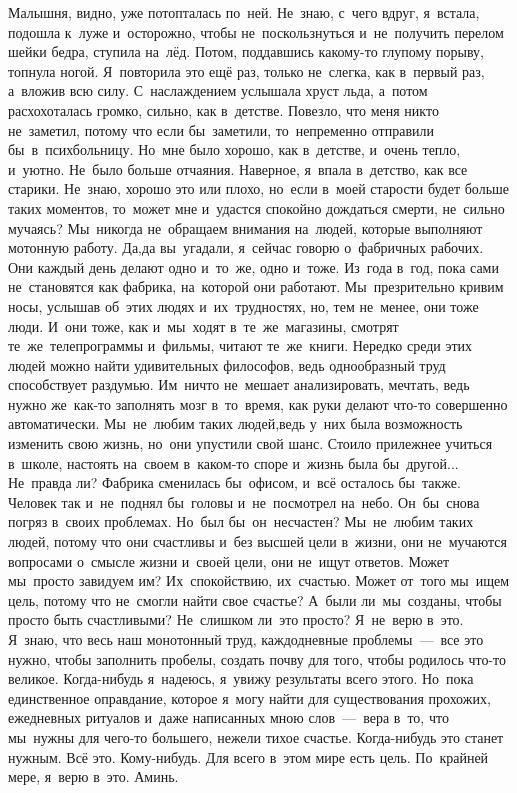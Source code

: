 Малышня, видно, уже потопталась по~ней.
Не~знаю, с~чего вдруг, я~встала, подошла к~луже и~осторожно, чтобы не~поскользнуться и~не~получить перелом шейки бедра, ступила на~лёд.
Потом, поддавшись какому-то глупому порыву, топнула ногой.
Я~повторила это ещё раз, только не~слегка, как в~первый раз, а~вложив всю силу.
С~наслаждением услышала хруст льда, а~потом расхохоталась громко, сильно, как в~детстве.
Повезло, что меня никто не~заметил, потому что если бы~заметили, то~непременно отправили бы~в~психбольницу.
Но~мне было хорошо, как в~детстве, и~очень тепло, и~уютно.
Не~было больше отчаяния.
Наверное, я~впала в~детство, как все старики.
Не~знаю, хорошо это или плохо, но~если в~моей старости будет больше таких моментов, то~может мне и~удастся спокойно дождаться смерти, не~сильно мучаясь?
\clearpage
\chaps{***} 
\lettrine[lines=3, loversize=0.1]{М}{}ы~никогда не~обращаем внимания на~людей, которые выполняют мотонную работу.
Да,да вы~угадали, я~сейчас говорю о~фабричных рабочих.
Они каждый день делают одно и~то~же, одно и~тоже.
Из~года в~год, пока сами не~становятся как фабрика, на~которой они работают.
Мы~презрительно кривим носы, услышав об~этих людях и~их~трудностях, но, тем не~менее, они тоже люди.
И~они тоже, как и~мы~ходят в~те~же~магазины, смотрят те~же~телепрограммы и~фильмы, читают те~же~книги.
Нередко среди этих людей можно найти удивительных философов, ведь однообразный труд способствует раздумью.
Им~ничто не~мешает анализировать, мечтать, ведь нужно же~как-то заполнять мозг в~то~время, как руки делают что-то совершенно автоматически.
Мы~не~любим таких людей,ведь у~них была возможность изменить свою жизнь, но~они упустили свой шанс.
Стоило прилежнее учиться в~школе, настоять на~своем в~каком-то споре и~жизнь была бы~другой... Не~правда ли? Фабрика сменилась бы~офисом, и~всё осталось бы~также.
Человек так и~не~поднял бы~головы и~не~посмотрел на~небо.
Он~бы~снова погряз в~своих проблемах.
Но~был бы~он~несчастен? Мы~не~любим таких людей, потому что они счастливы и~без высшей цели в~жизни, они не~мучаются вопросами о~смысле жизни и~своей цели, они не~ищут ответов.
Может мы~просто завидуем им? Их~спокойствию, их~счастью.
Может от~того мы~ищем цель, потому что не~смогли найти свое счастье? А~были ли~мы~созданы, чтобы просто быть счастливыми? Не~слишком ли~это просто? Я~не~верю в~это.
Я~знаю, что весь наш монотонный труд, каждодневные проблемы~---~все это нужно, чтобы заполнить пробелы, создать почву для того, чтобы родилось что-то великое.
Когда-нибудь я~надеюсь, я~увижу результаты всего этого.
Но~пока единственное оправдание, которое я~могу найти для существования прохожих, ежедневных ритуалов и~даже написанных мною слов~---~вера в~то, что мы~нужны для чего-то большего, нежели тихое счастье.
Когда-нибудь это станет нужным.
Всё это.
Кому-нибудь.
Для всего в~этом мире есть цель.
По~крайней мере, я~верю в~это.
Аминь.
 
